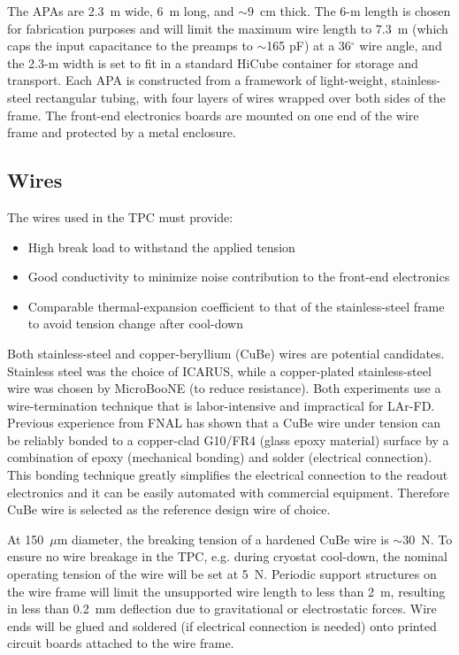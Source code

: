 The APAs are 2.3~m wide, 6~m long, and $\sim 9$~cm thick. The 6-m length is chosen for fabrication purposes and will limit the maximum wire length to 7.3~m (which caps the input capacitance to the preamps to $\sim$165 pF) at a 36$^\circ$ wire angle, and the 2.3-m width is set to fit in a standard HiCube container for storage and transport. 
Each APA is constructed from a framework of light-weight, stainless-steel rectangular tubing, 
with four layers of
wires wrapped over both sides of the frame.  The front-end electronics boards are mounted on 
one end of the wire frame and protected by a metal enclosure.  

\subsection{Wires}

The wires used in the TPC must provide:
\begin{itemize}
\item High break load to withstand the applied tension 
\item Good conductivity to minimize noise contribution to the front-end electronics
\item Comparable thermal-expansion coefficient to that of the stainless-steel 
frame to avoid tension change after cool-down
\end{itemize}

Both stainless-steel and copper-beryllium (CuBe) wires are potential candidates.  
Stainless steel was the choice of ICARUS, while a copper-plated 
stainless-steel wire was chosen by MicroBooNE  (to reduce resistance).  Both experiments use a wire-termination 
technique that is labor-intensive and impractical for LAr-FD. Previous experience from FNAL \cite{FNAL-proto-APA} has shown that a CuBe wire under 
tension can be reliably bonded to a copper-clad G10/FR4 (glass epoxy material) surface by a combination of  epoxy (mechanical bonding) 
and solder (electrical connection).  This bonding technique greatly simplifies the electrical 
connection to the readout electronics and it can be easily automated 
with commercial equipment.  Therefore CuBe wire is 
selected as the reference design wire of choice.

At 150~$\mu$m diameter,  the breaking tension of a hardened CuBe wire is $\sim$30~N.  
To ensure no wire breakage in the TPC, e.g. during cryostat cool-down, the nominal operating tension of the wire will be set at 5~N.  Periodic support structures on the wire frame will
limit the unsupported wire length to less than 2~m, resulting in less than 0.2~mm deflection due to gravitational or electrostatic forces.  Wire ends will be glued and soldered (if electrical connection is needed) 
onto printed circuit boards attached to the wire frame.

